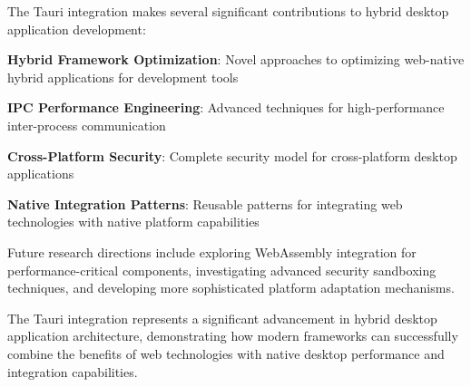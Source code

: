 The Tauri integration makes several significant contributions to hybrid desktop application development:

\begin{expandedlist}
    \item \textbf{Hybrid Framework Optimization}: Novel approaches to optimizing web-native hybrid applications for development tools
    \item \textbf{IPC Performance Engineering}: Advanced techniques for high-performance inter-process communication
    \item \textbf{Cross-Platform Security}: Complete security model for cross-platform desktop applications
    \item \textbf{Native Integration Patterns}: Reusable patterns for integrating web technologies with native platform capabilities
\end{expandedlist}

Future research directions include exploring WebAssembly integration for performance-critical components, investigating advanced security sandboxing techniques, and developing more sophisticated platform adaptation mechanisms.

The Tauri integration represents a significant advancement in hybrid desktop application architecture, demonstrating how modern frameworks can successfully combine the benefits of web technologies with native desktop performance and integration capabilities.
